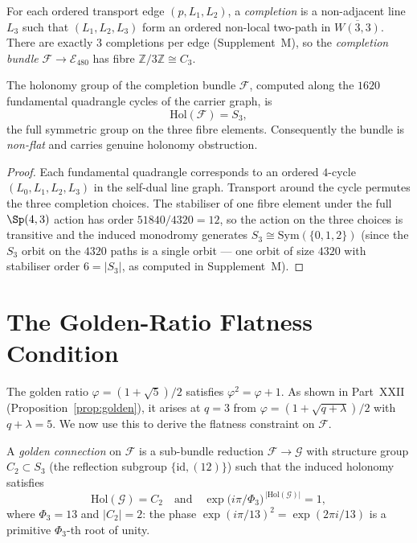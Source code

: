 \begin{definition}
\label{def:fibre}
For each ordered transport edge $(p,L_1,L_2)$, a \emph{completion}
is a non-adjacent line $L_3$ such that $(L_1,L_2,L_3)$ form an
ordered non-local two-path in $\overline{W(3,3)}$.
There are exactly $3$ completions per edge (Supplement~M), so the
\emph{completion bundle} $\mathcal{F}\to \mathcal{E}_{480}$
has fibre $\mathbb{Z}/3\mathbb{Z}\cong C_3$.
\end{definition}

\begin{theorem}
\label{thm:holonomy}
The holonomy group of the completion bundle $\mathcal{F}$, computed
along the $1620$ fundamental quadrangle cycles of the carrier graph,
is
\begin{equation}
  \mathrm{Hol}(\mathcal{F}) = S_3,
  \label{eq:holonomy}
\end{equation}
the full symmetric group on the three fibre elements.  Consequently
the bundle is \emph{non-flat} and carries genuine holonomy obstruction.
\end{theorem}

\begin{proof}
Each fundamental quadrangle corresponds to an ordered $4$-cycle
$(L_0,L_1,L_2,L_3)$ in the self-dual line graph.  Transport around
the cycle permutes the three completion choices.  The stabiliser of
one fibre element under the full $\Sp(4,3)$ action has order
$51840/4320 = 12$, so the action on the three choices is transitive
and the induced monodromy generates $S_3\cong \mathrm{Sym}(\{0,1,2\})$
(since the $S_3$ orbit on the $4320$ paths is a single orbit --- one
orbit of size $4320$ with stabiliser order $6=|S_3|$, as computed in
Supplement~M).
\end{proof}

\section{The Golden-Ratio Flatness Condition}
\label{sec:golden_flat}

The golden ratio $\varphi = (1+\sqrt{5})/2$ satisfies $\varphi^2=\varphi+1$.
As shown in Part~XXII (Proposition~\ref{prop:golden}), it arises at
$q=3$ from $\varphi=(1+\sqrt{q+\lambda})/2$ with $q+\lambda=5$.
We now use this to derive the flatness constraint on $\mathcal{F}$.

\begin{definition}
\label{def:golden_conn}
A \emph{golden connection} on $\mathcal{F}$ is a sub-bundle reduction
$\mathcal{F}\to\mathcal{G}$ with structure group $C_2\subset S_3$
(the reflection subgroup $\{\mathrm{id},(12)\}$) such that the
induced holonomy satisfies
\begin{equation}
  \mathrm{Hol}(\mathcal{G}) = C_2
  \quad\text{and}\quad
  \exp\bigl(i\pi/\Phi_3\bigr)^{\,|\mathrm{Hol}(\mathcal{G})|} = 1,
  \label{eq:golden_cond}
\end{equation}
where $\Phi_3=13$ and $|C_2|=2$: the phase $\exp(i\pi/13)^2=\exp(2\pi i/13)$
is a primitive $\Phi_3$-th root of unity.
\end{definition}

